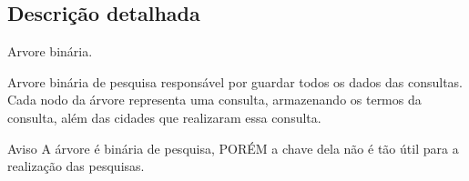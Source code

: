 \subsection{Descrição detalhada}
Arvore binária. 

Arvore binária de pesquisa responsável por guardar todos os dados das consultas. Cada nodo da árvore representa uma consulta, armazenando os termos da consulta, além das cidades que realizaram essa consulta.

\begin{DoxyWarning}{Aviso}
A árvore é binária de pesquisa, P\+O\+RÉM a chave dela não é tão útil para a realização das pesquisas. 
\end{DoxyWarning}
